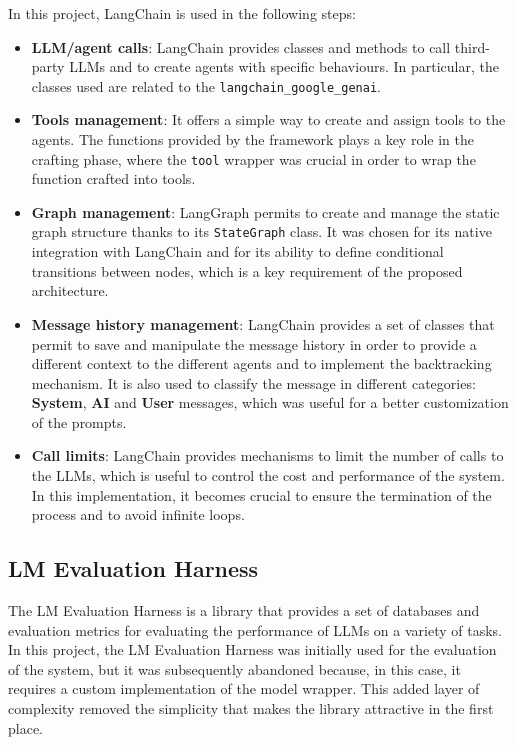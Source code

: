 \documentclass[12pt,a4paper,openright,twoside]{book}
\begin{document}
In this project, LangChain is used in the following steps:
\begin{itemize}
    \item \textbf{LLM/agent calls}: LangChain provides classes and methods to call third-party LLMs and to create agents with specific behaviours. In particular, the classes used are related to the \texttt{langchain\_google\_genai}. 
    \item \textbf{Tools management}: It offers a simple way to create and assign tools to the agents. The functions provided by the framework plays a key role in the crafting phase, where the \texttt{tool} wrapper was crucial in order to wrap the function crafted into tools.
    \item \textbf{Graph management}: LangGraph permits to create and manage the static graph structure thanks to its \texttt{StateGraph} class. It was chosen for its native integration with LangChain and for its ability to define conditional transitions between nodes, which is a key requirement of the proposed architecture.
    \item \textbf{Message history management}: LangChain provides a set of classes that permit to save and manipulate the message history in order to provide a different context to the different agents and to implement the backtracking mechanism. It is also used to classify the message in different categories: \textbf{System}, \textbf{AI} and \textbf{User} messages, which was useful for a better customization of the prompts.
    \item \textbf{Call limits}: LangChain provides mechanisms to limit the number of calls to the LLMs, which is useful to control the cost and performance of the system. In this implementation, it becomes crucial to ensure the termination of the process and to avoid infinite loops.
\end{itemize}
\subsection{LM Evaluation Harness}
The LM Evaluation Harness is a library that provides a set of databases and evaluation metrics for evaluating the performance of LLMs on a variety of tasks.
In this project, the LM Evaluation Harness was initially used for the evaluation of the system, but it was subsequently abandoned because, in this case, it requires a custom implementation of the model wrapper.
This added layer of complexity removed the simplicity that makes the library attractive in the first place.
\end{document}

